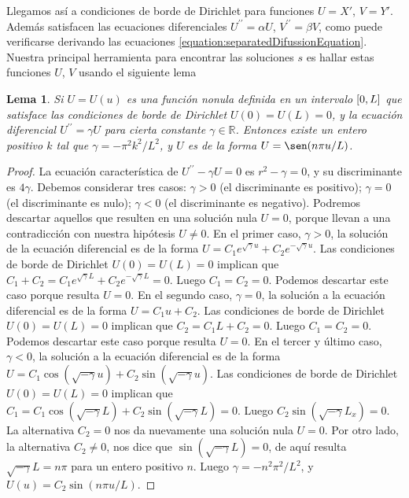 \documentclass{article}
\newcommand{\realNumbers}{\mathbb{R}}
\newcommand{\leftOpenInterval}{\left]}
\newcommand{\rightOpenInterval}{\right[}
\newcommand{\leftClosedInterval}{\left[}
\newcommand{\rightClosedInterval}{\right]}
\newcommand{\interval}[3]{%
  \ifstrequal{#1}{oo}{%
    \leftOpenInterval #2, #3 \rightOpenInterval%
  }{%
    \ifstrequal{#1}{co}{%
      \leftClosedInterval #2, #3 \rightOpenInterval%
    }{%
      \ifstrequal{#1}{oc}{
        \leftOpenInterval #2, #3 \rightClosedInterval%
      }{%
        \ifstrequal{#1}{cc}{
          \leftClosedInterval #2, #3 \rightClosedInterval
        }{%
        }%
      }%
    }%
  }%
}
\newtheorem{lemma}{Lema}
\begin{document}
  Llegamos así a condiciones de borde de Dirichlet para funciones \(U = X'\), \(V = Y'\).
  Además satisfacen las ecuaciones diferenciales \(U^{\prime\prime} = \alpha U\), \(V^{\prime\prime} = \beta V\), como puede verificarse derivando las ecuaciones \eqref{equation:separatedDifussionEquation}.
  Nuestra principal herramienta para encontrar las soluciones \(s\) es hallar estas funciones \(U\), \(V\) usando el siguiente lema
  \begin{lemma}
    \label{lemma:sinusoidSolution}
    Si \(U = U(u)\) es una función nonula definida en un intervalo \(\interval{cc}{0}{L}\) que satisface las condiciones de borde de Dirichlet \(U(0) = U(L) = 0\), y la ecuación diferencial \(U^{\prime\prime} = \gamma U\) para cierta constante \(\gamma \in \realNumbers\).
    Entonces existe un entero positivo \(k\) tal que \(\gamma = - \pi^2 k^2 / L^2\), y \(U\) es de la forma \(U = \sen(n \pi u / L)\).
  \end{lemma}
  \begin{proof}
    La ecuación característica de \(U^{\prime\prime} - \gamma U = 0\) es \(r^2 - \gamma = 0\), y su discriminante es \(4 \gamma\).
    Debemos considerar tres casos: \(\gamma > 0\) (el discriminante es positivo); \(\gamma = 0\) (el discriminante es nulo); \(\gamma < 0\) (el discriminante es negativo).
    Podremos descartar aquellos que resulten en una solución nula \(U = 0\), porque llevan a una contradicción con nuestra hipótesis \(U \neq 0\).
    En el primer caso, \(\gamma > 0\), la solución de la ecuación diferencial es de la forma \(U = C_1 e^{\sqrt{\gamma} u} + C_2 e^{- \sqrt{\gamma} u}\).
    Las condiciones de borde de Dirichlet \(U(0) = U(L) = 0\) implican que \(C_1 + C_2 = C_1 e^{\sqrt{\gamma} L} + C_2 e^{- \sqrt{\gamma} L} = 0\).
    Luego \(C_1 = C_2 = 0\).
    Podemos descartar este caso porque resulta \(U = 0\).
    En el segundo caso, \(\gamma = 0\), la solución a la ecuación diferencial es de la forma \(U = C_1 u + C_2\).
    Las condiciones de borde de Dirichlet \(U(0) = U(L) = 0\) implican que \(C_2 = C_1 L + C_2 = 0\).
    Luego \(C_1 = C_2 = 0\).
    Podemos descartar este caso porque resulta \(U = 0\).
    En el tercer y último caso, \(\gamma < 0\), la solución a la ecuación diferencial es de la forma \(U = C_1 \cos(\sqrt{-\gamma} u) + C_2 \sin(\sqrt{- \gamma} u)\).
    Las condiciones de borde de Dirichlet \(U(0) = U(L) = 0\) implican que \(C_1 = C_1 \cos(\sqrt{- \gamma} L) + C_2 \sin(\sqrt{- \gamma} L) = 0\).
    Luego \(C_2 \sin(\sqrt{- \gamma} L_x) = 0\).
    La alternativa \(C_2 = 0\) nos da nuevamente una solución nula \(U = 0\).
    Por otro lado, la alternativa \(C_2 \neq 0\), nos dice que \(\sin(\sqrt{- \gamma} L) = 0\), de aquí resulta \(\sqrt{- \gamma} L = n \pi\) para un entero positivo \(n\).
    Luego \(\gamma = - n^2 \pi^2 / L^2\), y \(U(u) = C_2 \sin(n \pi u / L)\).
  \end{proof}
\end{document}
